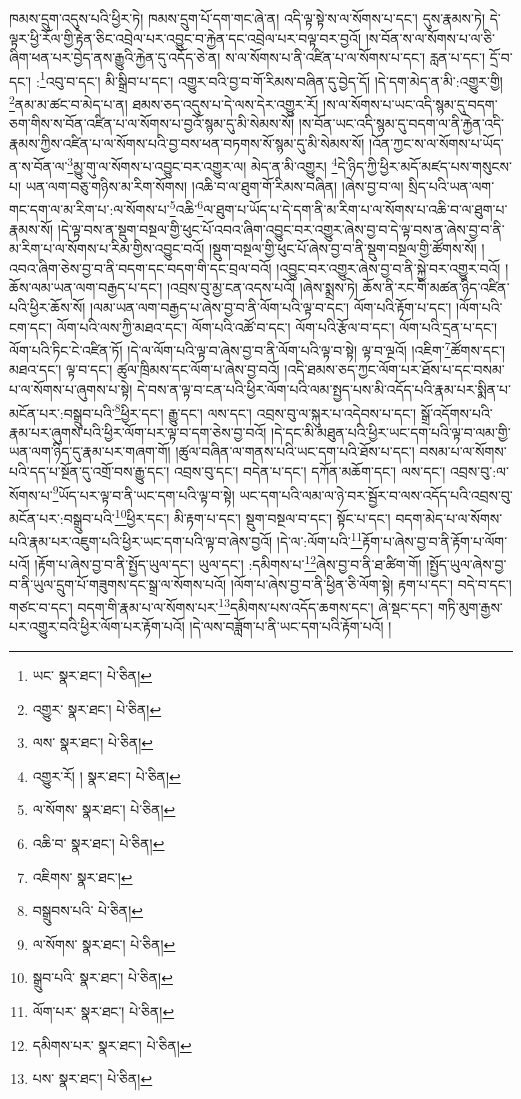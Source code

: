 ཁམས་དྲུག་འདུས་པའི་ཕྱིར་ཏེ། ཁམས་དྲུག་པོ་དག་གང་ཞེ་ན། འདི་ལྟ་སྟེ་ས་ལ་སོགས་པ་དང་། དུས་རྣམས་ཏེ། དེ་ལྟར་ཕྱི་རོལ་གྱི་རྟེན་ཅིང་འབྲེལ་པར་འབྱུང་བ་རྐྱེན་དང་འབྲེལ་པར་བལྟ་བར་བྱའོ། །ས་བོན་ས་ལ་སོགས་པ་ལ་ཅི་ཞིག་ཕན་པར་བྱེད་ནས་རྒྱུའི་རྐྱེན་དུ་འདོད་ཅེ་ན། ས་ལ་སོགས་པ་ནི་འཛིན་པ་ལ་སོགས་པ་དང་། རླན་པ་དང་། དྲོ་བ་དང་། :\footnote{ཡང་  སྣར་ཐང་།  པེ་ཅིན། }འབུ་བ་དང་། མི་སྒྲིབ་པ་དང་། འགྱུར་བའི་བྱ་བ་གོ་རིམས་བཞིན་དུ་བྱེད་དོ། །དེ་དག་མེད་ན་མི་:འགྱུར་གྱི། \footnote{འགྱུར་  སྣར་ཐང་།  པེ་ཅིན། }ནམ་མ་ཚང་བ་མེད་པ་ན། ཐམས་ཅད་འདུས་པ་དེ་ལས་དེར་འགྱུར་རོ། །ས་ལ་སོགས་པ་ཡང་འདི་སྙམ་དུ་བདག་ཅག་གིས་ས་བོན་འཛིན་པ་ལ་སོགས་པ་བྱའོ་སྙམ་དུ་མི་སེམས་སོ། །ས་བོན་ཡང་འདི་སྙམ་དུ་བདག་ལ་ནི་རྐྱེན་འདི་རྣམས་ཀྱིས་འཛིན་པ་ལ་སོགས་པའི་བྱ་བས་ཕན་བཏགས་སོ་སྙམ་དུ་མི་སེམས་སོ། །འོན་ཀྱང་ས་ལ་སོགས་པ་ཡོད་ན་ས་བོན་ལ་\footnote{ལས་  སྣར་ཐང་།  པེ་ཅིན། }མྱུ་གུ་ལ་སོགས་པ་འབྱུང་བར་འགྱུར་ལ། མེད་ན་མི་འགྱུར། \footnote{འགྱུར་རོ། །   སྣར་ཐང་།  པེ་ཅིན། }དེ་ཉིད་ཀྱི་ཕྱིར་མདོ་མཛད་པས་གསུངས་པ། ཡན་ལག་བཅུ་གཉིས་མ་རིག་སོགས། །འཆི་བ་ལ་ཐུག་གོ་རིམས་བཞིན། །ཞེས་བྱ་བ་ལ། སྲིད་པའི་ཡན་ལག་གང་དག་ལ་མ་རིག་པ་:ལ་སོགས་པ་\footnote{ལ་སོགས་  སྣར་ཐང་།  པེ་ཅིན། }འཆི་\footnote{འཆི་བ་  སྣར་ཐང་།  པེ་ཅིན། }ལ་ཐུག་པ་ཡོད་པ་དེ་དག་ནི་མ་རིག་པ་ལ་སོགས་པ་འཆི་བ་ལ་ཐུག་པ་རྣམས་སོ། །དེ་ལྟ་བས་ན་སྡུག་བསྔལ་གྱི་ཕུང་པོ་འབའ་ཞིག་འབྱུང་བར་འགྱུར་ཞེས་བྱ་བ་དེ་ལྟ་བས་ན་ཞེས་བྱ་བ་ནི་མ་རིག་པ་ལ་སོགས་པ་རིམ་གྱིས་འབྱུང་བའོ། །སྡུག་བསྔལ་གྱི་ཕུང་པོ་ཞེས་བྱ་བ་ནི་སྡུག་བསྔལ་གྱི་ཚོགས་སོ། །འབའ་ཞིག་ཅེས་བྱ་བ་ནི་བདག་དང་བདག་གི་དང་བྲལ་བའོ། །འབྱུང་བར་འགྱུར་ཞེས་བྱ་བ་ནི་སྐྱེ་བར་འགྱུར་བའོ། །ཆོས་ལམ་ཡན་ལག་བརྒྱད་པ་དང་། །འབྲས་བུ་མྱ་ངན་འདས་པའོ། །ཞེས་སྨྲས་ཏེ། ཆོས་ནི་རང་གི་མཚན་ཉིད་འཛིན་པའི་ཕྱིར་ཆོས་སོ། །ལམ་ཡན་ལག་བརྒྱད་པ་ཞེས་བྱ་བ་ནི་ལོག་པའི་ལྟ་བ་དང་། ལོག་པའི་རྟོག་པ་དང་། །ལོག་པའི་ངག་དང་། ལོག་པའི་ལས་ཀྱི་མཐའ་དང་། ལོག་པའི་འཚོ་བ་དང་། ལོག་པའི་རྩོལ་བ་དང་། ལོག་པའི་དྲན་པ་དང་། ལོག་པའི་ཏིང་ངེ་འཛིན་ཏོ། །དེ་ལ་ལོག་པའི་ལྟ་བ་ཞེས་བྱ་བ་ནི་ལོག་པའི་ལྟ་བ་སྟེ། ལྟ་བ་ལྔའོ། །འཇིག་\footnote{འཇིགས་  སྣར་ཐང་། }ཚོགས་དང་། མཐའ་དང་། ལྟ་བ་དང་། ཚུལ་ཁྲིམས་དང་ལོག་པ་ཞེས་བྱ་བའོ། །འདི་ཐམས་ཅད་ཀྱང་ལོག་པར་ཐོས་པ་དང་བསམ་པ་ལ་སོགས་པ་ཞུགས་པ་སྟེ། དེ་བས་ན་ལྟ་བ་ངན་པའི་ཕྱིར་ལོག་པའི་ལམ་སྤྱད་པས་མི་འདོད་པའི་རྣམ་པར་སྨིན་པ་མངོན་པར་:བསྒྲུབ་པའི་\footnote{བསྒྲུབས་པའི་  པེ་ཅིན། }ཕྱིར་དང་། རྒྱུ་དང་། ལས་དང་། འབྲས་བུ་ལ་སྐུར་པ་འདེབས་པ་དང་། སྒྲོ་འདོགས་པའི་རྣམ་པར་ཞུགས་པའི་ཕྱིར་ལོག་པར་ལྟ་བ་དག་ཅེས་བྱ་བའོ། །དེ་དང་མི་མཐུན་པའི་ཕྱིར་ཡང་དག་པའི་ལྟ་བ་ལམ་གྱི་ཡན་ལག་ཉིད་དུ་རྣམ་པར་གཞག་གོ། །ཚུལ་བཞིན་ལ་གནས་པའི་ཡང་དག་པའི་ཐོས་པ་དང་། བསམ་པ་ལ་སོགས་པའི་དད་པ་སྔོན་དུ་འགྲོ་བས་རྒྱུ་དང་། འབྲས་བུ་དང་། བདེན་པ་དང་། དཀོན་མཆོག་དང་། ལས་དང་། འབྲས་བུ་:ལ་སོགས་པ་\footnote{ལ་སོགས་  སྣར་ཐང་།  པེ་ཅིན། }ཡོད་པར་ལྟ་བ་ནི་ཡང་དག་པའི་ལྟ་བ་སྟེ། ཡང་དག་པའི་ལམ་ལ་ཉེ་བར་སྦྱོར་བ་ལས་འདོད་པའི་འབྲས་བུ་མངོན་པར་:བསྒྲུབ་པའི་\footnote{སྒྲུབ་པའི་  སྣར་ཐང་།  པེ་ཅིན། }ཕྱིར་དང་། མི་རྟག་པ་དང་། སྡུག་བསྔལ་བ་དང་། སྟོང་པ་དང་། བདག་མེད་པ་ལ་སོགས་པའི་རྣམ་པར་འཇུག་པའི་ཕྱིར་ཡང་དག་པའི་ལྟ་བ་ཞེས་བྱའོ། །དེ་ལ་:ལོག་པའི་\footnote{ལོག་པར་  སྣར་ཐང་།  པེ་ཅིན། }རྟོག་པ་ཞེས་བྱ་བ་ནི་རྟོག་པ་ལོག་པའོ། །རྟོག་པ་ཞེས་བྱ་བ་ནི་སྤྱོད་ཡུལ་དང་། ཡུལ་དང་། :དམིགས་པ་\footnote{དམིགས་པར་  སྣར་ཐང་།  པེ་ཅིན། }ཞེས་བྱ་བ་ནི་ཐ་ཚིག་གོ། །སྤྱོད་ཡུལ་ཞེས་བྱ་བ་ནི་ཡུལ་དྲུག་པོ་གཟུགས་དང་སྒྲ་ལ་སོགས་པའོ། །ལོག་པ་ཞེས་བྱ་བ་ནི་ཕྱིན་ཅི་ལོག་སྟེ། རྟག་པ་དང་། བདེ་བ་དང་། གཙང་བ་དང་། བདག་གི་རྣམ་པ་ལ་སོགས་པར་\footnote{པས་  སྣར་ཐང་།  པེ་ཅིན། }དམིགས་པས་འདོད་ཆགས་དང་། ཞེ་སྡང་དང་། གཏི་མུག་རྒྱས་པར་འགྱུར་བའི་ཕྱིར་ལོག་པར་རྟོག་པའོ། །དེ་ལས་བཟློག་པ་ནི་ཡང་དག་པའི་རྟོག་པའོ། །
